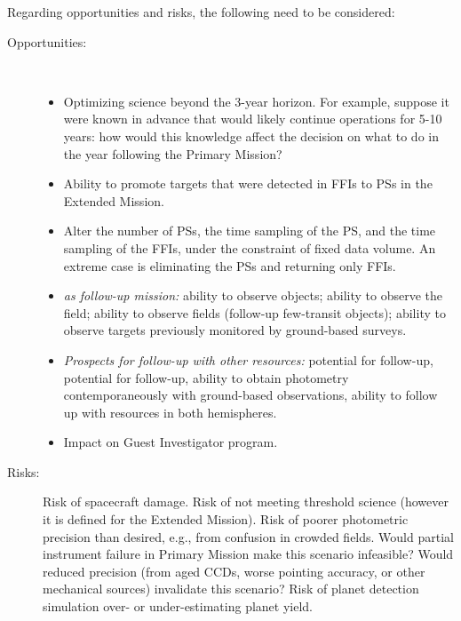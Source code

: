 Regarding opportunities and risks, the following need to be considered:
\begin{description}
	\item[Opportunities:]\ 
	\begin{itemize}
	\item Optimizing science beyond the 3-year horizon. For example, suppose it were known in advance
	that \tess would likely continue operations for 5-10 years: how would this knowledge affect
	the decision on what to do in the year following the Primary Mission?
		\item Ability to promote targets that were detected in FFIs to PSs in the Extended Mission.
		\item Alter the number of PSs, the time sampling of the PS, and the time sampling of the FFIs, under the constraint of fixed data volume. An extreme case is eliminating the PSs and returning only FFIs.
		\item \textit{\tess as follow-up mission:} ability to
                  observe \corot objects; ability to observe the \kepler
                  field;
                  ability to observe \ktwo fields (follow-up \ktwo
                  few-transit objects); ability to observe targets
                  previously monitored by ground-based surveys.
		\item \textit{Prospects for follow-up with other resources:}
		potential for \jwst follow-up, 
		potential for \cheops follow-up,
		ability to obtain \tess photometry contemporaneously with ground-based observations,
		ability to follow up with resources in both hemispheres.
		\item Impact on Guest Investigator program.
	\end{itemize}
	
	\item[Risks:] 
	Risk of spacecraft damage. 
	Risk of not meeting threshold science (however it is defined for the Extended Mission).
	Risk of poorer photometric precision than desired, e.g., from confusion in crowded fields.
	Would partial instrument failure in Primary Mission make this scenario infeasible? 
	Would reduced precision (from aged CCDs, worse pointing accuracy, or other mechanical sources) invalidate this scenario? 
	Risk of planet detection simulation over- or under-estimating planet yield.
\end{description}

